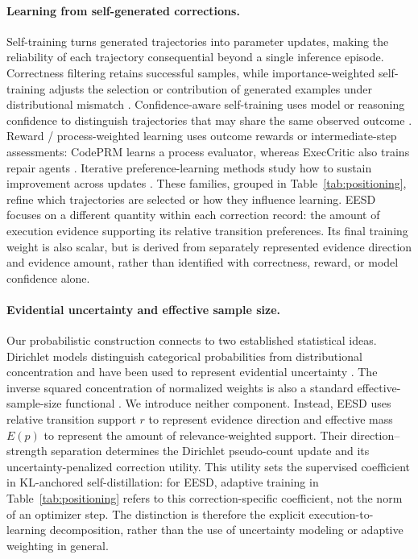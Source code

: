 \documentclass{article}
\newcommand{\method}{\textsc{EESD}\xspace}
\begin{document}
\paragraph{Learning from self-generated corrections.}
Self-training turns generated trajectories into parameter updates,
making the reliability of each trajectory consequential beyond a
single inference episode. Correctness filtering retains successful
samples, while importance-weighted self-training adjusts the selection
or contribution of generated examples under distributional mismatch
\citep{jiang2025importance}. Confidence-aware self-training uses model
or reasoning confidence to distinguish trajectories that may share
the same observed outcome \citep{jang2025corepo}. Reward / process-weighted
learning uses outcome rewards or intermediate-step assessments: CodePRM learns a process evaluator, whereas ExecCritic also trains repair agents \citep{li2025codeprm,tao2026execcritic}. Iterative
preference-learning methods study how to sustain improvement across
updates \citep{yang2025dnpo}. These families, grouped in
Table~\ref{tab:positioning}, refine which trajectories are selected
or how they influence learning. \method focuses on a different
quantity within each correction record: the amount of execution
evidence supporting its relative transition preferences. Its final
training weight is also scalar, but is derived from separately
represented evidence direction and evidence amount, rather than
identified with correctness, reward, or model confidence alone.

\paragraph{Evidential uncertainty and effective sample size.}
Our probabilistic construction connects to two established statistical
ideas. Dirichlet models distinguish categorical probabilities from
distributional concentration and have been used to represent evidential
uncertainty \citep{sensoy2018evidential}. The inverse squared
concentration of normalized weights is also a standard
effective-sample-size functional \citep{martino2017ess}. We introduce
neither component. Instead, \method uses relative transition support
$r$ to represent evidence direction and effective mass $E(p)$ to
represent the amount of relevance-weighted support. Their
direction--strength separation determines the Dirichlet pseudo-count
update and its uncertainty-penalized correction utility. This utility
sets the supervised coefficient in KL-anchored self-distillation:
for \method, adaptive training in Table~\ref{tab:positioning} refers
to this correction-specific coefficient, not the norm of an optimizer step. The distinction is therefore the explicit
execution-to-learning decomposition, rather than the use of
uncertainty modeling or adaptive weighting in general.
\end{document}
